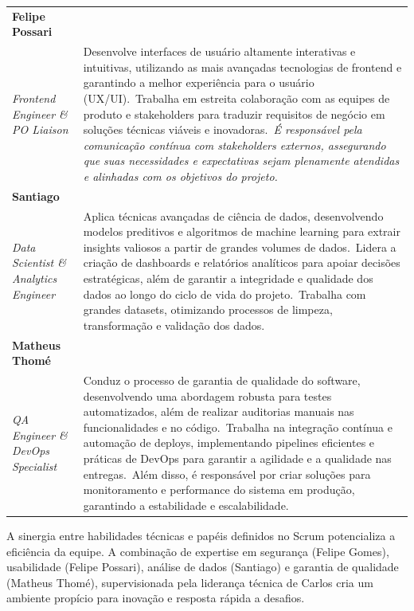 \documentclass[a5paper, 12pt]{article}
\begin{document}
\begin{longtable}[c]{@{} >{\raggedright\arraybackslash}p{4.5cm}>{\raggedright\arraybackslash}p{11cm} @{}}
\textbf{Felipe Possari} \\ \textit{Frontend Engineer \& PO Liaison} &
  Desenvolve interfaces de usuário altamente interativas e intuitivas, utilizando as mais avançadas tecnologias de frontend e garantindo a melhor experiência para o usuário (UX/UI).\
  Trabalha em estreita colaboração com as equipes de produto e stakeholders para traduzir requisitos de negócio em soluções técnicas viáveis e inovadoras.\
  \textit{É responsável pela comunicação contínua com stakeholders externos, assegurando que suas necessidades e expectativas sejam plenamente atendidas e alinhadas com os objetivos do projeto.} \\

\textbf{Santiago} \\ \textit{Data Scientist \& Analytics Engineer} &
  Aplica técnicas avançadas de ciência de dados, desenvolvendo modelos preditivos e algoritmos de machine learning para extrair insights valiosos a partir de grandes volumes de dados.\
  Lidera a criação de dashboards e relatórios analíticos para apoiar decisões estratégicas, além de garantir a integridade e qualidade dos dados ao longo do ciclo de vida do projeto.\
  Trabalha com grandes datasets, otimizando processos de limpeza, transformação e validação dos dados. \\

\textbf{Matheus Thomé} \\ \textit{QA Engineer \& DevOps Specialist} &
  Conduz o processo de garantia de qualidade do software, desenvolvendo uma abordagem robusta para testes automatizados, além de realizar auditorias manuais nas funcionalidades e no código.\
  Trabalha na integração contínua e automação de deploys, implementando pipelines eficientes e práticas de DevOps para garantir a agilidade e a qualidade nas entregas.\
  Além disso, é responsável por criar soluções para monitoramento e performance do sistema em produção, garantindo a estabilidade e escalabilidade. \\

\end{longtable}

A sinergia entre habilidades técnicas e papéis definidos no Scrum potencializa a eficiência da equipe. A combinação de expertise em segurança (Felipe Gomes), usabilidade (Felipe Possari), análise de dados (Santiago) e garantia de qualidade (Matheus Thomé), supervisionada pela liderança técnica de Carlos cria um ambiente propício para inovação e resposta rápida a desafios.
\end{document}
